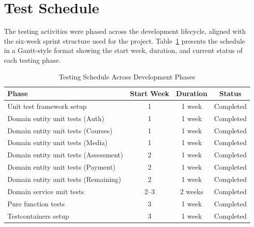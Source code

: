 
\section{Test Schedule}
\label{sec:test-schedule}

The testing activities were phased across the development lifecycle, aligned with the six-week sprint structure used for the project. Table~\ref{tab:test-schedule} presents the schedule in a Gantt-style format showing the start week, duration, and current status of each testing phase.

\begin{table}[H]
  \centering
  \caption{Testing Schedule Across Development Phases}\label{tab:test-schedule}
  \small
  \begin{tabular}{lccc}
    \toprule
    \textbf{Phase}                        & \textbf{Start Week} & \textbf{Duration} & \textbf{Status} \\
    \midrule
    Unit test framework setup             & 1                   & 1 week            & Completed    \\
    Domain entity unit tests (Auth)       & 1                   & 1 week            & Completed    \\
    Domain entity unit tests (Courses)    & 1                   & 1 week            & Completed    \\
    Domain entity unit tests (Media)      & 1                   & 1 week            & Completed    \\
    Domain entity unit tests (Assessment) & 2                   & 1 week            & Completed    \\
    Domain entity unit tests (Payment)    & 2                   & 1 week            & Completed    \\
    Domain entity unit tests (Remaining)  & 2                   & 1 week            & Completed    \\
    Domain service unit tests             & 2--3                & 2 weeks           & Completed    \\
    Pure function tests                   & 3                   & 1 week            & Completed    \\
    \midrule
    Testcontainers setup                  & 3                   & 1 week            & Completed    \\

\end{tabular}
\end{table}

